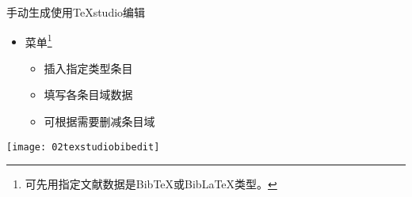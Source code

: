 \documentclass[fontset = none, t]{ctexbeamer}
\begin{document}
\begin{frame}[fragile]{手动生成}{使用TeXstudio编辑}
  \begin{spacing}{1.3}
    \begin{itemize}
    \item {}菜单\footnote[frame,2]{可先用指定文献数据是Bib\TeX 或Bib\LaTeX 类型。}
      \begin{itemize}
      \item 插入指定类型条目
      \item 填写各条目域数据
      \item 可根据需要删减条目域
      \end{itemize}
    \end{itemize}
    \begin{center}
      \texttt{[image: 02texstudiobibedit]}
    \end{center}
  \end{spacing}  
\end{frame}
\end{document}
